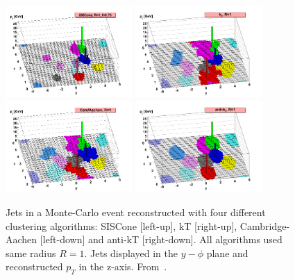 \begin{figure}[!Hhtbp]
  \begin{center}
    \includegraphics[width=0.43\textwidth]{figs/herwig-parton-level-ev-siscone-R1-0-f0-75-ghosted4root.png}
    \includegraphics[width=0.43\textwidth]{figs/herwig-parton-level-ev-kt-R1-0-ghosted4root.png}
    \includegraphics[width=0.43\textwidth]{figs/herwig-parton-level-ev-cam-R1-0-ghosted4root.png}
    \includegraphics[width=0.43\textwidth]{figs/herwig-parton-level-ev-antikt-R1-0-ghosted4root.png}
    \caption{Jets in a Monte-Carlo event reconstructed with four different clustering algorithms: SISCone [left-up], kT [right-up], Cambridge-Aachen [left-down] and anti-kT [right-down]. All algorithms used same radius $R=1$. Jets displayed in the $y-\phi$ plane and reconstructed $p_{T}$ in the z-axis. From~\cite{Cacciari:2008gp}.}
    \label{fig:JetsAlgos}
  \end{center}
\end{figure}

